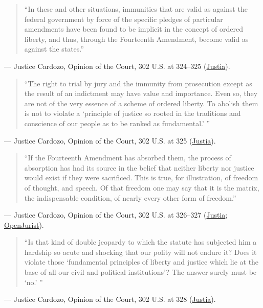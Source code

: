 \documentclass[12pt]{article}
\begin{document}
\begin{quote}
``In these and other situations, immunities that are valid as against the federal government by force of the specific pledges of particular amendments have been found to be implicit in the concept of ordered liberty, and thus, through the Fourteenth Amendment, become valid as against the states.''
\end{quote}
\noindent --- Justice Cardozo, Opinion of the Court, 302 U.S. at 324--325 (\href{https://supreme.justia.com/cases/federal/us/302/319/}{Justia}).

\begin{quote}
``The right to trial by jury and the immunity from prosecution except as the result of an indictment may have value and importance. Even so, they are not of the very essence of a scheme of ordered liberty. To abolish them is not to violate a `principle of justice so rooted in the traditions and conscience of our people as to be ranked as fundamental.' ''
\end{quote}
\noindent --- Justice Cardozo, Opinion of the Court, 302 U.S. at 325 (\href{https://supreme.justia.com/cases/federal/us/302/319/}{Justia}).

\begin{quote}
``If the Fourteenth Amendment has absorbed them, the process of absorption has had its source in the belief that neither liberty nor justice would exist if they were sacrificed. This is true, for illustration, of freedom of thought, and speech. Of that freedom one may say that it is the matrix, the indispensable condition, of nearly every other form of freedom.''
\end{quote}
\noindent --- Justice Cardozo, Opinion of the Court, 302 U.S. at 326--327 (\href{https://supreme.justia.com/cases/federal/us/302/319/}{Justia}; \href{https://openjurist.org/302/us/319/palko-v-state-of-connecticut}{OpenJurist}).

\begin{quote}
``Is that kind of double jeopardy to which the statute has subjected him a hardship so acute and shocking that our polity will not endure it? Does it violate those `fundamental principles of liberty and justice which lie at the base of all our civil and political institutions'? The answer surely must be `no.' ''
\end{quote}
\noindent --- Justice Cardozo, Opinion of the Court, 302 U.S. at 328 (\href{https://supreme.justia.com/cases/federal/us/302/319/}{Justia}).
\end{document}
